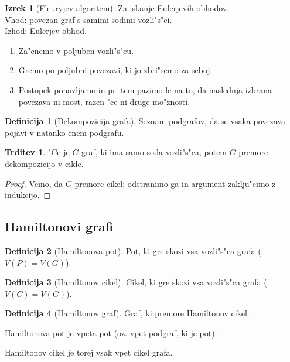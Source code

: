 \documentclass{article}
\theoremstyle{definition}
\newtheorem{definition}{Definicija}[section]
\newtheorem{claim}{Trditev}[section]
\newtheorem{theorem}{Izrek}[section]
\begin{document}
	\begin{theorem}[Fleuryjev algoritem]
		Za iskanje Eulerjevih obhodov. \\
		Vhod: povezan graf s samimi sodimi vozli"s"ci. \\
		Izhod: Eulerjev obhod.
		\begin{enumerate}
			\item Za"cnemo v poljuben vozli"s"cu.
			\item Gremo po poljubni povezavi, ki jo zbri"semo za seboj.
			\item Postopek ponavljamo in pri tem pazimo le na to, da naslednja izbrana povezava ni most, razen "ce ni druge mo"znosti.
		\end{enumerate}
	\end{theorem}

	\begin{definition}[Dekompozicija grafa]
		Seznam podgrafov, da se vsaka povezava pojavi v natanko enem podgrafu.
	\end{definition}

	\begin{claim}
		"Ce je $G$ graf, ki ima samo soda vozli"s"ca, potem $G$ premore dekompozicijo v cikle.	
		\begin{proof}
			Vemo, da $G$ premore cikel; odstranimo ga in argument zaklju"cimo z indukcijo.
		\end{proof}
	\end{claim}

	\subsection{Hamiltonovi grafi}
	\begin{definition}[Hamiltonova pot]
		Pot, ki gre skozi vsa vozli"s"ca grafa ($V(P) = V(G)$).
	\end{definition}

	\begin{definition}[Hamiltonov cikel]
		Cikel, ki gre skozi vsa vozli"s"ca grafa ($V(C) = V(G)$).
	\end{definition}
	
	\begin{definition}[Hamiltonov graf]
		Graf, ki premore Hamiltonov cikel.
	\end{definition}

	Hamiltonova pot je vpeta pot (oz. vpet podgraf, ki je pot).
	
	Hamiltonov cikel je torej vsak vpet cikel grafa.
	
\end{document}

